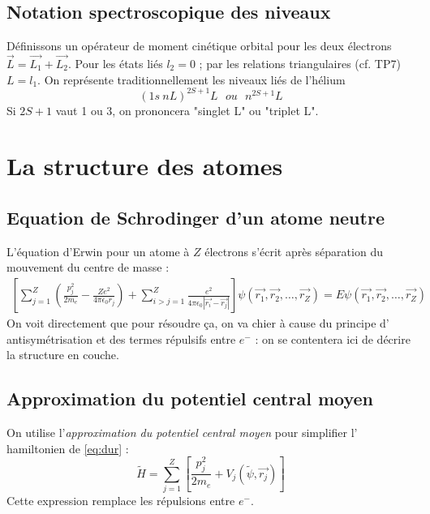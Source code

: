 \documentclass[british,french,11pt, a4paper, openany]{book}
\begin{document}
\subsection{Notation spectroscopique des niveaux}
Définissons un opérateur de moment cinétique orbital pour les deux électrons $\vec{L}
=\vec{L_1}+\vec{L_2}$. Pour les états liés $l_2=0$ ; par les relations triangulaires 
(cf. TP7) $L=l_1$. On représente traditionnellement les niveaux liés de l'hélium
\begin{equation}
	(1s\ nL)^{2S+1}L\ \ \ ou\ \ \ n^{2S+1}L
\end{equation}
Si $2S+1$ vaut 1 ou 3, on prononcera "singlet L" ou "triplet L".


\section{La structure des atomes}
\subsection{Equation de Schrodinger d'un atome neutre}
L'équation d'Erwin pour un atome à $Z$ électrons s'écrit après séparation du 
mouvement du centre de masse :
\begin{multline}
	\left[\sum_{j=1}^Z \left(\frac{p_j^2}{2m_e}-\frac{Ze^2}{4\pi\epsilon_0r_j}\right) + 
	\sum_{i>j=1}^Z \frac{e^2}{4\pi\epsilon_0|\vec{r_i}-\vec{r_j}|}\right]\psi(\vec{r_1},
	\vec{r_2},\dots,\vec{r_Z})
	= E\psi(\vec{r_1},\vec{r_2},\dots,\vec{r_Z})
	\label{eq:dur}
\end{multline}
On voit directement que pour résoudre ça, on va chier à cause du principe d'
antisymétrisation et des termes répulsifs entre $e^-$ : on se contentera ici de
décrire la structure en couche.

\subsection{Approximation du potentiel central moyen}
On utilise l'\textit{approximation du potentiel central moyen} pour simplifier l'
hamiltonien de \autoref{eq:dur} :
\begin{equation}
	\tilde{H} = \sum_{j=1}^Z \left[\frac{p_j^2}{2m_e}+V_j(\tilde{\psi},\vec{r_j})\right]
	\label{eq:ApproxCentralMoyen}
\end{equation}
Cette expression remplace les répulsions entre $e^-$.
\end{document}
